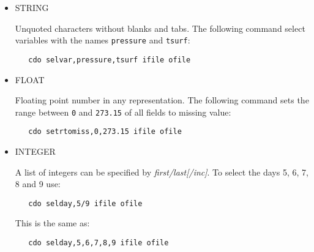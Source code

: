\begin{itemize}
\item STRING

Unquoted characters without blanks and tabs.
The following command select variables with the names {\tt pressure} and {\tt tsurf}:
\begin{verbatim}
   cdo selvar,pressure,tsurf ifile ofile
\end{verbatim}

\item FLOAT

Floating point number in any representation.
The following command sets the range between {\tt 0} and {\tt 273.15}
of all fields to missing value:
\begin{verbatim}
   cdo setrtomiss,0,273.15 ifile ofile
\end{verbatim}

\item INTEGER

A list of integers can be specified by {\it first/last[/inc]}.
To select the days 5, 6, 7, 8 and 9 use:
\begin{verbatim}
   cdo selday,5/9 ifile ofile
\end{verbatim}
This is the same as:
\begin{verbatim}
   cdo selday,5,6,7,8,9 ifile ofile
\end{verbatim}
\end{itemize}
